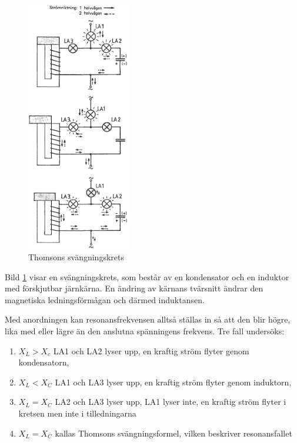 \begin{figure}[ht]
\begin{center}
  \includegraphics[width=0.4\textwidth]{images/cropped_pdfs/bild_2_3-17.pdf}
  \caption{Thomsons svängningskrets}
  \label{fig:BildII3-17}
\end{center}
\end{figure}

Bild \ref{fig:BildII3-17} visar en svängningskrets, som består av en
kondensator och en induktor med förskjutbar järnkärna.
En ändring av kärnans tvärsnitt ändrar den magnetiska ledningsförmågan och
därmed induktansen.

Med anordningen kan resonansfrekvensen alltså ställas in så att den blir högre,
lika med eller lägre än den anslutna spänningens frekvens.
Tre fall undersöks:
\begin{enumerate}
\item \(X_L > X_c\) LA1 och LA2 lyser upp, en kraftig ström flyter genom
  kondensatorn,
\item \(X_L < X_C\) LA1 och LA3 lyser upp, en kraftig ström flyter genom
  induktorn,
\item \(X_L= X_C\) LA2 och LA3 lyser upp, LA1 lyser inte, en kraftig ström
  flyter i kretsen men inte i tilledningarna
\item \(X_L = X_C\) kallas Thomsons svängningsformel, vilken beskriver
  resonansfallet
\end{enumerate}

